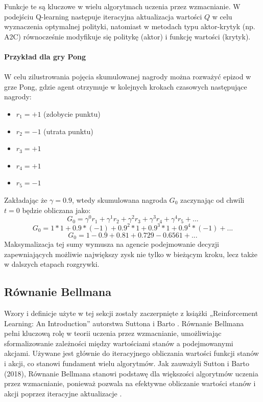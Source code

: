 \documentclass[a4paper, 12pt]{article}
\begin{document}
    Funkcje te są kluczowe w wielu algorytmach uczenia przez wzmacnianie. 
    W podejściu Q-learning następuje iteracyjna aktualizacja wartości \( Q \) w celu wyznaczenia optymalnej polityki,
    natomiast w metodach typu aktor-krytyk (np. A2C) równocześnie modyfikuje się politykę (aktor) i funkcję wartości (krytyk).
    \\ \\ 
    \textbf{Przykład dla gry Pong}
    \\ \\ 
    W celu zilustrowania pojęcia skumulowanej nagrody można rozważyć epizod w grze Pong, gdzie agent otrzymuje w kolejnych krokach czasowych następujące nagrody:    \begin{itemize}
        \item \( r_1 = +1 \) (zdobycie punktu)
        \item \( r_2 = -1 \) (utrata punktu)
        \item \( r_3 = +1 \)
        \item \( r_4 = +1 \)
        \item \( r_5 = -1 \)
    \end{itemize}
    Zakładając że \( \gamma = 0.9 \), wtedy skumulowana nagroda \( G_0 \) zaczynając od chwili \( t = 0 \) będzie obliczana jako:
    \[ G_0 = \gamma^0r_1 + \gamma^1r_2 + \gamma^2r_3 + \gamma^3r_4 + \gamma^4r_5 + ... \]
    \[ G_0 = 1 * 1 + 0.9 * (-1) + 0.9^2 * 1 + 0.9^3 * 1 + 0.9^4 * (-1) + ... \]
    \[ G_0 = 1 - 0.9 + 0.81 + 0.729 - 0.6561 + ... \]
    Maksymalizacja tej sumy wymusza na agencie podejmowanie decyzji zapewniających możliwie największy zysk nie tylko w bieżącym kroku, lecz także w dalszych etapach rozgrywki.
    \subsection{Równanie Bellmana}
    Wzory i definicje użyte w tej sekcji zostały zaczerpnięte z książki „Reinforcement Learning: An Introduction” autorstwa Suttona i Barto \cite{sutton2018rl}.
    Równanie Bellmana pełni kluczową rolę w teorii uczenia przez wzmacnianie, umożliwiając sformalizowanie zależności między wartościami stanów a podejmowanymi akcjami.
    Używane jest głównie do iteracyjnego obliczania wartości funkcji stanów i akcji, co stanowi fundament wielu algorytmów. 
    Jak zauważyli Sutton i Barto (2018), Równanie Bellmana stanowi podstawę dla większości algorytmów uczenia przez wzmacnianie, ponieważ pozwala na efektywne obliczanie wartości stanów i akcji poprzez iteracyjne aktualizacje \cite{sutton2018rl}.
\end{document}
